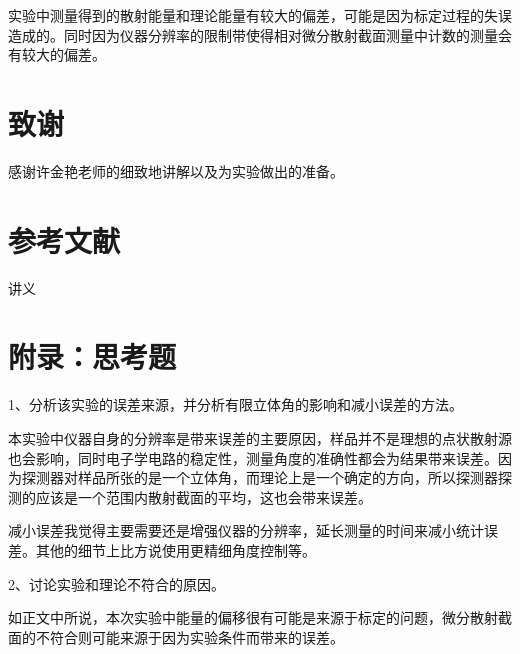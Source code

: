 \documentclass[a4paper,10.0pt,twoside]{npr}
\begin{document}
\begin{multicols}{2}
实验中测量得到的散射能量和理论能量有较大的偏差，可能是因为标定过程的失误造成的。同时因为仪器分辨率的限制带使得相对微分散射截面测量中计数的测量会有较大的偏差。

\section{致谢}
感谢许金艳老师的细致地讲解以及为实验做出的准备。
\section{参考文献}

\noindent
[1] 讲义
\end{multicols}

\newpage


\section*{附录：思考题}
1、分析该实验的误差来源，并分析有限立体角的影响和减小误差的方法。

本实验中仪器自身的分辨率是带来误差的主要原因，样品并不是理想的点状散射源也会影响，同时电子学电路的稳定性，测量角度的准确性都会为结果带来误差。因为探测器对样品所张的是一个立体角，而理论上是一个确定的方向，所以探测器探测的应该是一个范围内散射截面的平均，这也会带来误差。

减小误差我觉得主要需要还是增强仪器的分辨率，延长测量的时间来减小统计误差。其他的细节上比方说使用更精细角度控制等。

2、讨论实验和理论不符合的原因。

如正文中所说，本次实验中能量的偏移很有可能是来源于标定的问题，微分散射截面的不符合则可能来源于因为实验条件而带来的误差。

\clearpage
\end{document}
